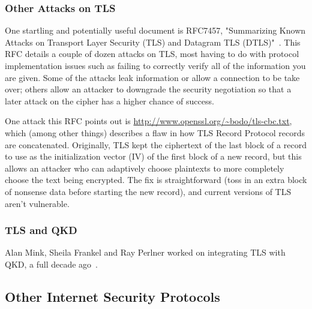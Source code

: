 



\subsubsection{Other Attacks on TLS}

One startling and potentially useful document is RFC7457, "Summarizing
Known Attacks on Transport Layer Security (TLS) and Datagram TLS
(DTLS)"~\cite{RFC7457}.  This RFC details a couple of dozen attacks on
TLS, most having to do with protocol implementation issues such as
failing to correctly verify all of the information you are given.
Some of the attacks leak information or allow a connection to be take
over; others allow an attacker to downgrade the security negotiation
so that a later attack on the cipher has a higher chance of success.

One attack this RFC points out is
\url{http://www.openssl.org/~bodo/tls-cbc.txt}, which (among other things)
describes a flaw in how TLS Record Protocol records are concatenated.
Originally, TLS kept the ciphertext of the last block of a record to
use as the initialization vector (IV) of the first block of a new
record, but this allows an attacker who can adaptively choose
plaintexts to more completely choose the text being encrypted.  The
fix is straightforward (toss in an extra block of nonsense data before
starting the new record), and current versions of TLS aren't
vulnerable.

\subsubsection{TLS and QKD}

Alan Mink, Sheila Frankel and Ray Perlner worked on integrating TLS
with QKD, a full decade ago~\cite{mink09:_qkd_and_ipsec}.


\subsection{Other Internet Security Protocols}

